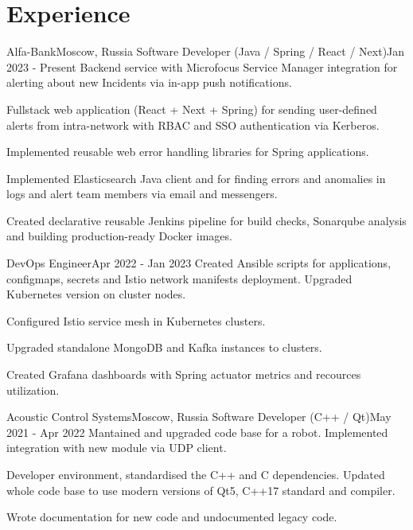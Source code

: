 

\section{Experience}\label{sec:experience}
\resumeSubHeadingListStart

\resumeSubheading
{Alfa-Bank}{Moscow, Russia}
    {Software Developer (Java / Spring / React / Next)}{Jan 2023 - Present}
    \resumeItemListStart
        {Backend service with Microfocus Service Manager integration for alerting about new Incidents via in-app push notifications.}

        {Fullstack web application (React + Next + Spring) for sending user-defined alerts from intra-network with RBAC and SSO authentication via Kerberos.}

        {Implemented reusable web error handling libraries for Spring applications.}

        {Implemented Elasticsearch Java client and for finding errors and anomalies in logs and alert team members via email and messengers.}

        {Created declarative reusable Jenkins pipeline for build checks, Sonarqube analysis and building production-ready Docker images.}
    \resumeItemListEnd

\resumeSubSubheading
{DevOps Engineer}{Apr 2022 - Jan 2023}
    \resumeItemListStart
        {Created Ansible scripts for applications, configmaps, secrets and Istio network manifests deployment. Upgraded Kubernetes version on cluster nodes.}

        {Configured Istio service mesh in Kubernetes clusters.}

        {Upgraded standalone MongoDB and Kafka instances to clusters.}

        {Created Grafana dashboards with Spring actuator metrics and recources utilization.}
    \resumeItemListEnd

\resumeSubheading
{Acoustic Control Systems}{Moscow, Russia}
    {Software Developer (C++ / Qt)}{May 2021 - Apr 2022}
    \resumeItemListStart
        {Mantained and upgraded code base for a robot. Implemented integration with new module via UDP client.}

        {Developer environment, standardised the C++ and C dependencies. Updated whole code base to use modern versions of Qt5, C++17 standard and compiler.}

        {Wrote documentation for new code and undocumented legacy code.}
    \resumeItemListEnd
\resumeSubHeadingListEnd